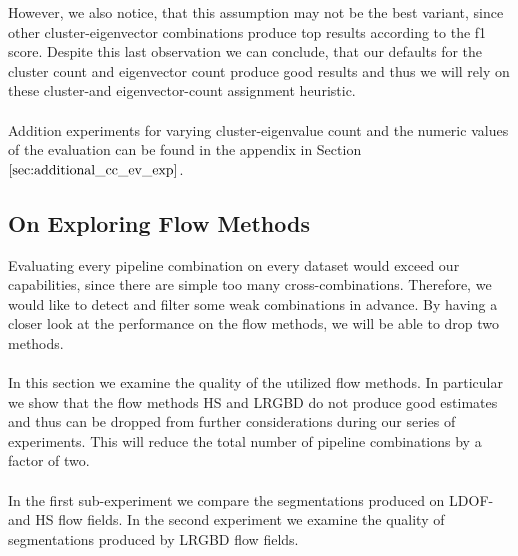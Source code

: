 However, we also notice, that this assumption may not be the best variant, since other cluster-eigenvector combinations produce top results according to the f1 score. Despite this last observation we can conclude, that our defaults for the cluster count and eigenvector count produce good results and thus we will rely on these cluster-and eigenvector-count assignment heuristic. \\ \\
Addition experiments for varying cluster-eigenvalue count and the numeric values of the evaluation can be found in the appendix in Section $\ref{sec:additional_cc_ev_exp}$.


\subsection{On Exploring Flow Methods}
\label{sec:flow_methods}
Evaluating every pipeline combination on every dataset would exceed our capabilities, since there are simple too many cross-combinations. Therefore, we would like to detect and filter some weak combinations in advance. By having a closer look at the performance on the flow methods, we will be able to drop two methods. \\ \\
In this section we examine the quality of the utilized flow methods. In particular we show that the flow methods HS and LRGBD do not produce good estimates and thus can be dropped from further considerations during our series of experiments. This will reduce the total number of pipeline combinations by a factor of two. \\ \\
In the first sub-experiment we compare the segmentations produced on LDOF-and HS flow fields. In the second experiment we examine the quality of segmentations produced by LRGBD flow fields.

